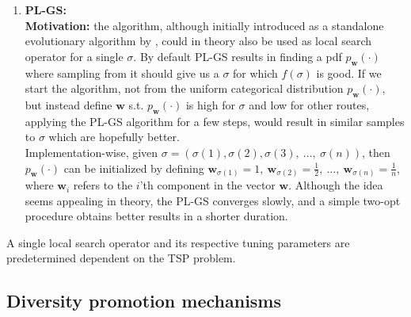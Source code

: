 \documentclass[a4paper,10pt]{article}
\newcommand{\ReplaceMe}[1]{{\color{blue}#1}}
\begin{document}
\begin{enumerate}
		\item \textbf{PL-GS:} \\
		\textbf{Motivation:} the algorithm, although initially introduced as a standalone evolutionary algorithm by \citeauthor{santucci_gradient_2020}, could in theory also be used as local search operator for a single $\sigma$. By default PL-GS results in finding a pdf $p_\mathbf{w}(\cdot)$ where sampling from it should give us a $\sigma$ for which $f(\sigma)$ is good. If we start the algorithm, not from the uniform categorical distribution $p_\mathbf{w}(\cdot)$, but instead define $\mathbf{w}$ s.t. $p_\mathbf{w}(\cdot)$ is high for $\sigma$ and low for other routes, applying the PL-GS algorithm for a few steps, would result in similar samples to $\sigma$ which are hopefully better. \\
		Implementation-wise, given $\sigma = \left( \sigma(1), \sigma(2), \sigma(3),~\dots,~\sigma(n) \right)$, then $p_\mathbf{w}(\cdot)$ can be initialized by defining $\mathbf{w}_{\sigma(1)} = 1,~\mathbf{w}_{\sigma(2)} = \frac{1}{2},~\dots,~\mathbf{w}_{\sigma(n)} = \frac{1}{n}$, where $\mathbf{w}_i$ refers to the $i$'th component in the vector $\mathbf{w}$. Although the idea seems appealing in theory, the PL-GS converges slowly, and a simple two-opt procedure obtains better results in a shorter duration.
	\end{enumerate}
	A single local search operator and its respective tuning parameters are predetermined dependent on the TSP problem.
		



\subsection{Diversity promotion mechanisms}
	
\end{document}
